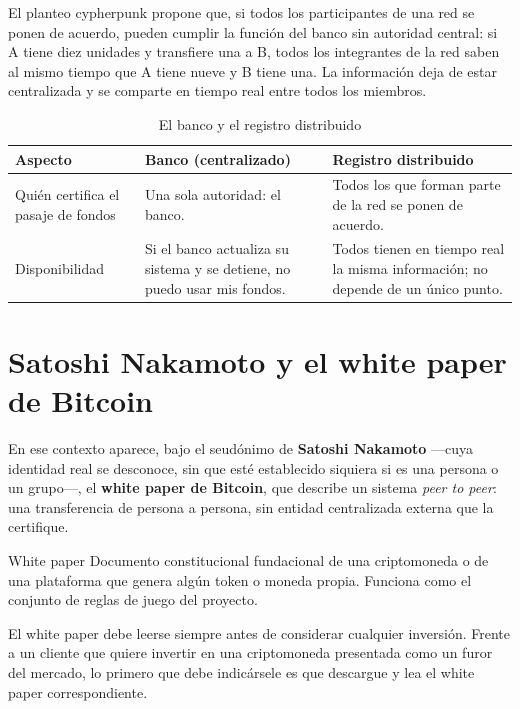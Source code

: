 \documentclass[12pt,oneside]{book}
\begin{document}
El planteo cypherpunk propone que, si todos los participantes de una red se ponen de acuerdo, pueden cumplir la función del banco sin autoridad central: si A tiene diez unidades y transfiere una a B, todos los integrantes de la red saben al mismo tiempo que A tiene nueve y B tiene una. La información deja de estar centralizada y se comparte en tiempo real entre todos los miembros.

\begin{table}[H]
\centering
\caption{El banco y el registro distribuido}
\renewcommand{\arraystretch}{1.2}
\begin{tabularx}{\textwidth}{>{\raggedright\arraybackslash}p{}XX}
\toprule
\textbf{Aspecto} & \textbf{Banco (centralizado)} & \textbf{Registro distribuido} \\
\midrule
Quién certifica el pasaje de fondos & Una sola autoridad: el banco. & Todos los que forman parte de la red se ponen de acuerdo. \\
Disponibilidad & Si el banco actualiza su sistema y se detiene, no puedo usar mis fondos. & Todos tienen en tiempo real la misma información; no depende de un único punto. \\
\bottomrule
\end{tabularx}
\end{table}

\section{Satoshi Nakamoto y el white paper de Bitcoin}
\label{sec:whitepaper}

En ese contexto aparece, bajo el seudónimo de \textbf{Satoshi Nakamoto} ---cuya identidad real se desconoce, sin que esté establecido siquiera si es una persona o un grupo---, el \textbf{white paper de Bitcoin}, que describe un sistema \emph{peer to peer}: una transferencia de persona a persona, sin entidad centralizada externa que la certifique.

\begin{definition}{White paper}
Documento constitucional fundacional de una criptomoneda o de una plataforma que genera algún token o moneda propia. Funciona como el conjunto de reglas de juego del proyecto.
\end{definition}

\begin{important}
El white paper debe leerse siempre antes de considerar cualquier inversión. Frente a un cliente que quiere invertir en una criptomoneda presentada como un furor del mercado, lo primero que debe indicársele es que descargue y lea el white paper correspondiente.
\end{important}
\end{document}
